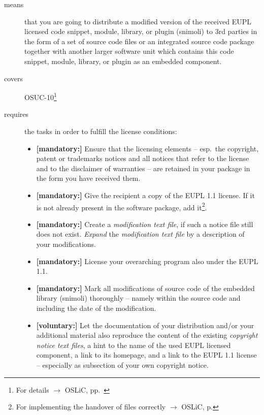 \begin{description}
\item[means] that you are going to distribute a modified version of the received
EUPL licensed code snippet, module, library, or plugin (snimoli) to 3rd
parties in the form of a set of source code files or an integrated source code
package together with another larger software unit which contains this code
snippet, module, library, or plugin as an embedded component.
\item[covers] OSUC-10\footnote{For details $\rightarrow$ OSLiC, pp.\ \pageref{OSUC-10-DEF}}
\item[requires] the tasks in order to fulfill the license conditions:
\begin{itemize}

  \item \textbf{[mandatory:]} Ensure that the licensing elements -- esp.\ the
  copyright, patent or trademarks notices and all notices that refer to the
  license and to the disclaimer of warranties -- are retained in your package in
  the form you have received them.

  \item \textbf{[mandatory:]} Give the recipient a copy of the EUPL 1.1
  license. If it is not already present in the software package, add
  it\footnote{For implementing the handover of files correctly $\rightarrow$
  OSLiC, p. \pageref{DistributingFilesHint}}.

  \item \textbf{[mandatory:]} Create a \emph{modification text file}, if such a
  notice file still does not exist. \emph{Expand} the \emph{modification text
  file} by a description of your modifications.
  
  \item \textbf{[mandatory:]} License your overarching program also under the
  EUPL 1.1.
  
  \item \textbf{[mandatory:]} Mark all modifications of source code of the
  embedded library (snimoli) thoroughly --
  namely within the source code and including the date of the modification.
  
  \item \textbf{[voluntary:]} Let the documentation of your distribution and/or
  your additional material  also reproduce the content of the existing
  \emph{copyright notice text files}, a hint to the name of the used EUPL
  licensed component, a link to its homepage, and a link to the EUPL 1.1 license
  -- especially as subsection of your own copyright notice.
 

\end{itemize}
\end{description}
